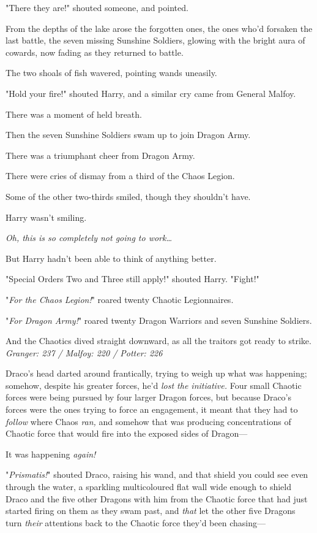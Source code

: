 "There they are!" shouted someone, and pointed.

From the depths of the lake arose the forgotten ones, the ones who'd forsaken
the last battle, the seven missing Sunshine Soldiers, glowing with the bright
aura of cowards, now fading as they returned to battle.

The two shoals of fish wavered, pointing wands uneasily.

"Hold your fire!" shouted Harry, and a similar cry came from General Malfoy.

There was a moment of held breath.

Then the seven Sunshine Soldiers swam up to join Dragon Army.

There was a triumphant cheer from Dragon Army.

There were cries of dismay from a third of the Chaos Legion.

Some of the other two-thirds smiled, though they shouldn't have.

Harry wasn't smiling.

\emph{Oh, this is so completely not going to work…}

But Harry hadn't been able to think of anything better.

"Special Orders Two and Three still apply!" shouted Harry. "Fight!"

"\emph{For the Chaos Legion!}" roared twenty Chaotic Legionnaires.

"\emph{For Dragon Army!}" roared twenty Dragon Warriors and seven Sunshine
Soldiers.

And the Chaotics dived straight downward, as all the traitors got ready to
strike.
\later
\emph{Granger: 237 / Malfoy: 220 / Potter: 226}

Draco's head darted around frantically, trying to weigh up what was happening;
somehow, despite his greater forces, he'd \emph{lost the initiative.} Four
small Chaotic forces were being pursued by four larger Dragon forces, but
because Draco's forces were the ones trying to force an engagement, it meant
that they had to \emph{follow} where Chaos \emph{ran,} and somehow that was
producing concentrations of Chaotic force that would fire into the exposed
sides of Dragon---

It was happening \emph{again!}

"\emph{Prismatis!}" shouted Draco, raising his wand, and that shield you could
see even through the water, a sparkling multicoloured flat wall wide enough to
shield Draco and the five other Dragons with him from the Chaotic force that
had just started firing on them as they swam past, and \emph{that} let the
other five Dragons turn \emph{their} attentions back to the Chaotic force
they'd been chasing---

